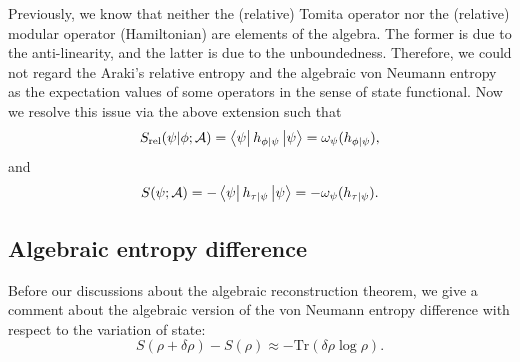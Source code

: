 \documentclass[a4paper,11pt]{article}
\newcommand{\diracprod}[3]{\left\langle  #1 \vphantom{#2#3} \right|#2 \left| #3 \vphantom{#1#2} \right\rangle } %
\renewcommand{\=}[1]{\stackrel{#1}{=}} %
\def\A{\mathcal{A}}
\def\Tr{\text{Tr}}
\def\Srel{S_{\text{rel}}}
\begin{document}
Previously, we know that neither the (relative) Tomita operator nor the (relative) modular operator (Hamiltonian) are elements of the algebra. The former is due to the anti-linearity, and the latter is due to the unboundedness. Therefore, we could not regard the Araki's relative entropy and the algebraic von Neumann entropy as the expectation values of some operators in the sense of state functional. Now we resolve this issue via the above extension such that
\begin{equation}\label{def:Arakis relative entropy2}
	\Srel(\psi|\phi;\A)=\diracprod{\psi}{h_{\phi|\psi}}{\psi}=\omega_\psi(h_{\phi|\psi}),
\end{equation}
and
\begin{equation}\label{eq:algvnentropy2}
	S(\psi;\A)=-\diracprod{\psi}{h_{\tau|\psi}}{\psi}=-\omega_\psi(h_{\tau|\psi}).
\end{equation}




\subsection{Algebraic entropy difference}

Before our discussions about the algebraic reconstruction theorem, we give a comment about the algebraic version of the von Neumann entropy difference with respect to the variation of state:
\begin{equation}\label{eq:entropy diff}
	S(\rho+\delta\rho)-S(\rho)\approx-\Tr(\delta\rho\log\rho).
\end{equation}
\end{document}
